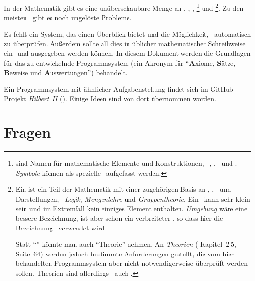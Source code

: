 In der Mathematik gibt es eine unüberschaubare Menge an \Axiomen, \Saetzen, \Beweisen, \emph{\Fachbegriffen}%
\footnote{%
	 sind Namen für mathematische Elemente und Konstruktionen, \textzB\ \Axiomen, \Saetze, \Beweise\ und \Fachgebiete.
	\emph{Symbole} können als spezielle \Fachbegriffe\ aufgefasst werden.
}
und \emph{\Fachgebieten}%
\footnote{%
	Ein  ist ein Teil der Mathematik mit einer zugehörigen Basis an \Axiomen, \Saetzen, \Fachbegriffen\ und Darstellungen, \textzB\ \emph{Logik}, \emph{Mengenlehre} und \emph{Gruppentheorie}.
	Ein \Fachgebiet\ kann sehr klein sein und im Extremfall kein einziges Element enthalten.
	\emph{Umgebung} wäre eine bessere Bezeichnung, ist aber schon ein verbreiteter \Fachbegriff, so dass hier die Bezeichnung \Fachgebiet\ verwendet wird.

	Statt "`\Fachgebiet"' könnte man auch "`Theorie"' nehmen.
	An \emph{Theorien} ( Kapitel~2.5, Seite~64) werden jedoch bestimmte Anforderungen gestellt, die vom hier behandelten Programmsystem aber nicht notwendigerweise überprüft werden sollen.
	Theorien sind allerdings \textiAlg\ auch \Fachgebiete.
}.
Zu den meisten \Fachgebieten\ gibt es noch ungelöste Probleme.

Es fehlt ein System, das einen Überblick bietet und die Möglichkeit, \Beweise\ automatisch zu überprüfen.
Außerdem sollte all dies in üblicher mathematischer Schreibweise ein- und ausgegeben werden können.
In diesem Dokument werden die Grundlagen für das zu entwickelnde Programmsystem  (ein Akronym für "`\textbf{A}xiome, \textbf{S}ätze, \textbf{B}eweise und \textbf{A}uswertungen"') behandelt.

Ein Programmsystem mit ähnlicher Aufgabenstellung findet sich im GitHub Projekt \emph{Hilbert~II} (\cite{bib:HilbertII, bib:qedeq}).
Einige Ideen sind von dort übernommen worden.

\section     {Fragen}%
\label   {sec-Fragen}

